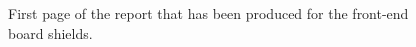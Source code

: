 \begin{figure}[h!]
    \centering
    \caption{First page of the report that has been produced for the front-end board shields.}
    \label{figSHIELDreport}
\end{figure}

